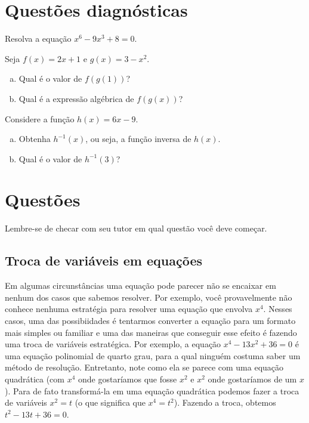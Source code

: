 \documentclass[main_estudante.tex]{subfiles}
\begin{document}
\newpage

\section{Questões diagnósticas}

\begin{diagnostico}
Resolva a equação $x^6-9x^3+8=0$.
\end{diagnostico}

\vspace{3cm}

\begin{diagnostico}
Seja $f(x)=2x+1$ e $g(x)=3-x^2$.
\begin{enumerate}[a)]
  \item Qual é o valor de $f(g(1))$?
  \item Qual é a expressão algébrica de $f(g(x))$?
\end{enumerate}
\end{diagnostico}

\vspace{3cm}

\begin{diagnostico}
Considere a função $h(x)=6x-9$.
\begin{enumerate}[a)]
  \item Obtenha $h^{-1}(x)$, ou seja, a função inversa de $h(x)$.
  \item Qual é o valor de $h^{-1}(3)$?
\end{enumerate}
\end{diagnostico}

\newpage

\section{Questões}

Lembre-se de checar com seu tutor em qual questão você deve começar.

\subsection*{Troca de variáveis em equações}

Em algumas circunstâncias uma equação pode parecer não se encaixar em nenhum dos casos que sabemos resolver. Por exemplo, você provavelmente não conhece nenhuma estratégia para resolver uma equação que envolva $x^4$. Nesses casos, uma das possibiidades é tentarmos converter a equação para um formato mais simples ou familiar e uma das maneiras que conseguir esse efeito é fazendo uma troca de variáveis estratégica. Por exemplo, a equação $x^4-13x^2+36=0$ é uma equação polinomial de quarto grau, para a qual ninguém costuma saber um método de resolução. Entretanto, note como ela se parece com uma equação quadrática (com $x^4$ onde gostaríamos que fosse $x^2$ e $x^2$ onde gostaríamos de um $x$). Para de fato transformá-la em uma equação quadrática podemos fazer a troca de variáveis $x^2=t$ (o que significa que $x^4=t^2$). Fazendo a troca, obtemos $t^2-13t+36=0$.
\end{document}

